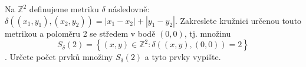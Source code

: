 Na $\mathbb{Z}^{2}$ definujeme metriku $\delta$ následovně: $\delta
((x_{1},y_{1}),(x_{2},y_{2}))=\left | x_{1}-x_{2} \right |+\left | y_{1}-y_{2}
\right |$. Zakreslete kružnici určenou touto metrikou a poloměru 2 se středem v
bodě $(0,0)$, tj. množinu 
$$S_{\delta}(2) = \left \{ (x,y) \in \mathbb{Z}^{2}:
\delta((x,y),(0,0))=2 \right \}$$. 
Určete počet prvků množiny $S_{\delta}(2)$ a tyto prvky vypište.
